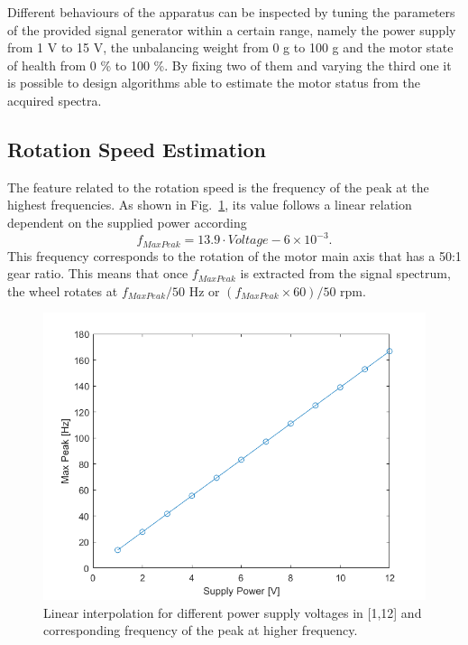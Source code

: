 \documentclass[12pt]{article}
\begin{document}
Different behaviours of the apparatus can be inspected by tuning the parameters of the provided signal generator within a certain range, namely the power supply from 1 V to 15 V, the unbalancing weight from 0 g to 100 g and the motor state of health from 0 \% to 100 \%. By fixing two of them and varying the third one it is possible to design algorithms able to estimate the motor status from the acquired spectra. 
	\subsection{Rotation Speed Estimation}
	The feature related to the rotation speed is the frequency of the peak at the highest frequencies. As shown in Fig.~\ref{fig:voltagefeature}, its value follows a linear relation dependent on the supplied power according 
	 	\begin{equation}
	 		f_{MaxPeak} = 13.9\cdot Voltage-6\times 10^{-3}.
	 	\end{equation}
   	This frequency corresponds to the rotation of the motor main axis that has a 50:1 gear ratio. This means that once $f_{MaxPeak}$ is extracted from the signal spectrum, the wheel rotates at $f_{MaxPeak} / 50$ Hz or $(f_{MaxPeak}\times 60)/50$ rpm.
   		\begin{figure}[h]
	   		\centering
	   		\includegraphics[width=0.9\linewidth]{Figures/VoltageFeature}
	   		\caption{Linear interpolation for different power supply voltages in [1,12] and corresponding frequency of the peak at higher frequency.}
	   		\label{fig:voltagefeature}
   		\end{figure}
\end{document}

